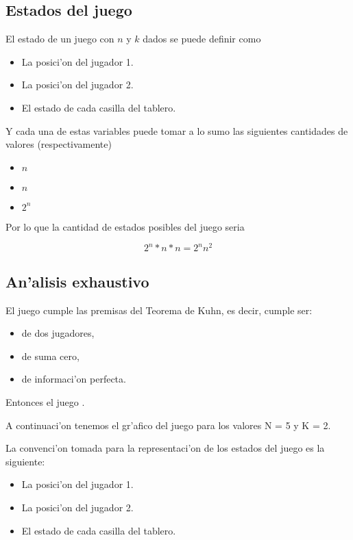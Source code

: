\subsection{Estados del juego}
El estado de un juego con $n$ y $k$ dados se puede definir como

\begin{itemize}
\item La posici'on del jugador 1.
\item La posici'on del jugador 2.
\item El estado de cada casilla del tablero.
\end{itemize}

Y cada una de estas variables puede tomar a lo sumo las siguientes cantidades de valores (respectivamente)

\begin{itemize}
\item $n$
\item $n$
\item $2^n$
\end{itemize}

Por lo que la cantidad de estados posibles del juego seria

$$2^n * n * n = 2^n n^2$$



\subsection{An'alisis exhaustivo}
El juego cumple las premisas del Teorema de Kuhn, es decir, cumple ser:

\begin{itemize}
\item de dos jugadores,
\item de suma cero,
\item de informaci'on perfecta.
\end{itemize}

Entonces el juego .

A continuaci'on tenemos el gr'afico del juego  para los valores N = 5 y K = 2.

La convenci'on tomada para la representaci'on de los estados del juego es la siguiente:

\begin{itemize}
\item La posici'on del jugador 1.
\item La posici'on del jugador 2.
\item El estado de cada casilla del tablero.
\end{itemize}

